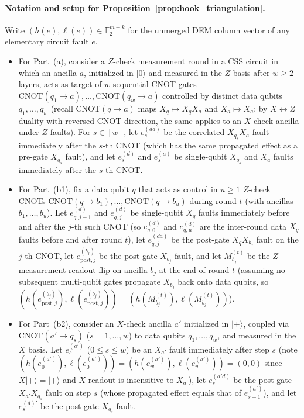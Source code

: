 \documentclass[12pt]{article}
\theoremstyle{definition}
\newcommand{\Ftwo}{\mathbb{F}_2}
\begin{document}
\paragraph{Notation and setup for Proposition~\ref{prop:hook_triangulation}.}
Write $(h(e), \ell(e)) \in \Ftwo^{m+k}$ for the unmerged DEM column vector of any elementary circuit fault $e$.
\begin{itemize}
  \item For Part~(a), consider a $Z$-check measurement round in a CSS circuit in which an ancilla $a$, initialized
    in $|0\rangle$ and measured in the $Z$ basis after $w \ge 2$ layers, acts as target of $w$ sequential CNOT
    gates $\mathrm{CNOT}(q_1 \to a), \dots, \mathrm{CNOT}(q_w \to a)$ controlled by distinct data qubits $q_1,
    \dots, q_w$ (recall $\mathrm{CNOT}(q \to a)$ maps $X_q \mapsto X_q X_a$ and $X_a \mapsto X_a$; by $X
    \leftrightarrow Z$ duality with reversed CNOT direction, the same applies to an $X$-check ancilla under $Z$
    faults). For $s \in [w]$, let $e^{(da)}_s$ be the correlated $X_{q_s} X_a$ fault immediately after the $s$-th
    CNOT (which has the same propagated effect as a pre-gate $X_{q_s}$ fault), and let $e^{(d)}_s$ and $e^{(a)}_s$
    be single-qubit $X_{q_s}$ and $X_a$ faults immediately after the $s$-th CNOT.
  \item For Part~(b1), fix a data qubit $q$ that acts as control in $u \ge 1$ $Z$-check CNOTs $\mathrm{CNOT}(q \to
    b_1), \dots, \mathrm{CNOT}(q \to b_u)$ during round $t$ (with ancillas $b_1, \dots, b_u$). Let
    $e^{(d)}_{q, j-1}$ and $e^{(d)}_{q, j}$ be single-qubit $X_q$ faults immediately before and after the $j$-th
    such CNOT (so $e^{(d)}_{q, 0}$ and $e^{(d)}_{q, u}$ are the inter-round data $X_q$ faults before and after
    round $t$), let $e^{(da)}_{q, j}$ be the post-gate $X_q X_{b_j}$ fault on the $j$-th CNOT, let
    $e^{(b_j)}_{\mathrm{post}, j}$ be the post-gate $X_{b_j}$ fault, and let $M_{b_j}^{(t)}$ be the $Z$-measurement
    readout flip on ancilla $b_j$ at the end of round $t$ (assuming no subsequent multi-qubit gates propagate
    $X_{b_j}$ back onto data qubits, so $(h(e^{(b_j)}_{\mathrm{post}, j}), \ell(e^{(b_j)}_{\mathrm{post}, j})) =
    (h(M_{b_j}^{(t)}), \ell(M_{b_j}^{(t)}))$).
  \item For Part~(b2), consider an $X$-check ancilla $a'$ initialized in $|+\rangle$, coupled via $\mathrm{CNOT}(a'
    \to q_s)$ ($s = 1, \dots, w$) to data qubits $q_1, \dots, q_w$, and measured in the $X$ basis. Let
    $e^{(a')}_s$ ($0 \le s \le w$) be an $X_{a'}$ fault immediately after step $s$ (note $(h(e^{(a')}_0),
    \ell(e^{(a')}_0)) = (h(e^{(a')}_w), \ell(e^{(a')}_w)) = (0, 0)$ since $X|+\rangle = |+\rangle$ and $X$ readout
    is insensitive to $X_{a'}$), let $e^{(a' d)}_s$ be the post-gate $X_{a'} X_{q_s}$ fault on step $s$ (whose
    propagated effect equals that of $e^{(a')}_{s-1}$), and let $e^{(d)'}_s$ be the post-gate $X_{q_s}$ fault.
\end{itemize}
\end{document}
